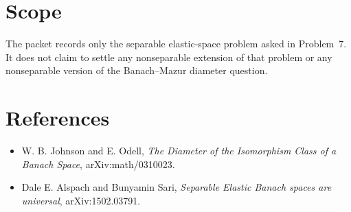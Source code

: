 \documentclass[11pt]{article}
\begin{document}
\section*{Scope}

The packet records only the separable elastic-space problem asked in
Problem~7. It does not claim to settle any nonseparable extension of that
problem or any nonseparable version of the Banach--Mazur diameter question.

\section*{References}

\begin{itemize}
\item W. B. Johnson and E. Odell, \emph{The Diameter of the Isomorphism
Class of a Banach Space}, arXiv:math/0310023.
\item Dale E. Alspach and Bunyamin Sari, \emph{Separable Elastic Banach
spaces are universal}, arXiv:1502.03791.
\end{itemize}
\end{document}

